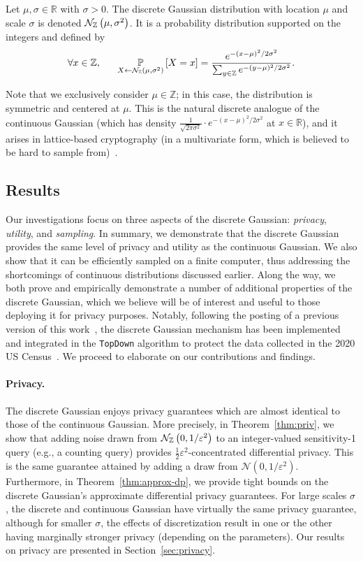 \documentclass{jpcfinal} %
\newcommand{\dgausss}[2]{{\discN\left(#1,#2\right)}}
\newcommand{\dgauss}[1]{\dgausss{0}{#1}}
\newcommand{\pr}[2]{{\ifx&#1& \mathbb{P} \else
\underset{#1}{\mathbb{P}} \fi \left[#2\right]}}
\newcommand{\eps}{\varepsilon}
\newcommand{\Z}{\mathbb{Z}}
\newcommand{\R}{\mathbb{R}}
\begin{document}
\begin{defi}
Let $\mu,\sigma\in\R$ with $\sigma > 0$. The discrete Gaussian distribution with location $\mu$ and scale $\sigma$ is denoted $\dgausss{\mu}{\sigma^2}$. It is a probability distribution supported on the integers and defined by 
\begin{equation}
\forall x \in \Z, ~~~~~ \pr{X \gets \dgausss{\mu}{\sigma^2}}{X=x}=\frac{e^{-(x-\mu)^2/2\sigma^2}}{\sum_{y \in \Z} e^{-(y-\mu)^2/2\sigma^2}}.
\end{equation}
\end{defi}
Note that we exclusively consider $\mu \in \Z$; in this case, the distribution is symmetric and centered at $\mu$. This is the natural discrete analogue of the continuous Gaussian (which has density $\frac{1}{\sqrt{2\pi\sigma^2}} \cdot e^{-(x-\mu)^2/2\sigma^2}$ at $x \in \R$), and it arises in lattice-based cryptography (in a multivariate form, which is believed to be hard to sample from)~\cite[etc.]{GentryPV08,Regev09,Peikert10,Stephens-Davidowitz17}.

\subsection{Results}

Our investigations focus on three aspects of the discrete Gaussian: \emph{privacy}, \emph{utility}, and \emph{sampling}. In summary, we demonstrate that the discrete Gaussian provides the same level of privacy and utility as the continuous Gaussian. We also show that it can be efficiently sampled on a finite computer, thus addressing the shortcomings of continuous distributions discussed earlier. Along the way, we both prove and empirically demonstrate a number of additional properties of the discrete Gaussian, which we believe will be of interest and useful to those deploying it for privacy purposes. Notably, following the posting of a previous version of this work~\cite{CKS20}, the discrete Gaussian mechanism has been implemented and integrated in the \texttt{TopDown} algorithm to protect the data collected in the 2020 US Census~\citep{DAS21}. We proceed to elaborate on our contributions and findings.

\paragraph{Privacy.} The discrete Gaussian enjoys privacy guarantees which are almost identical to those of the continuous Gaussian. More precisely, in Theorem~\ref{thm:priv}, we show that adding noise drawn from $\dgauss{1/\eps^2}$ to an integer-valued sensitivity-1 query (e.g., a counting query) provides $\frac12 \eps^2$-concentrated differential privacy. This is the same guarantee attained by adding a draw from $\mathcal{N}(0,1/\eps^2)$. Furthermore, in Theorem~\ref{thm:approx-dp}, we provide tight bounds on the discrete Gaussian's approximate differential privacy guarantees. For large scales $\sigma$, the discrete and continuous Gaussian have virtually the same privacy guarantee, although for smaller $\sigma$, the effects of discretization result in one or the other having marginally stronger privacy (depending on the parameters). Our results on privacy are presented in Section~\ref{sec:privacy}.
\end{document}
